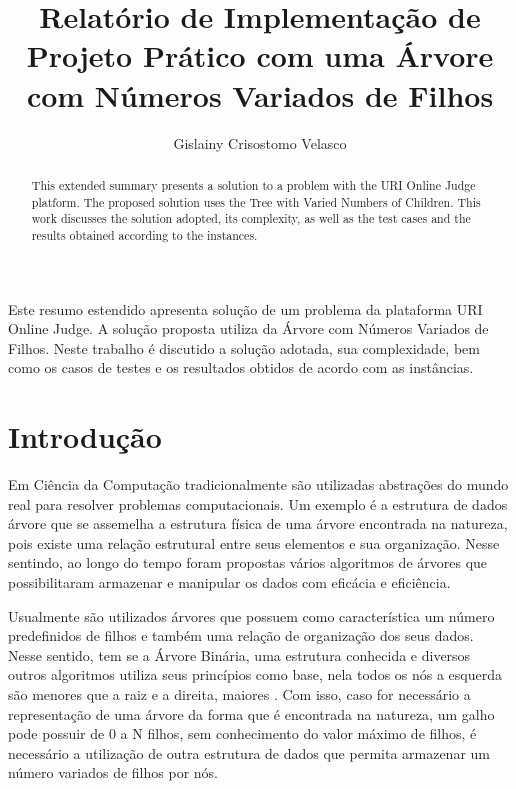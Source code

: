 \documentclass[12pt]{article}
\title{Relatório de Implementação de Projeto Prático com uma Árvore com Números Variados de Filhos}
\author{Gislainy Crisostomo Velasco}
\begin{document}
 

\maketitle

\begin{abstract}
  This extended summary presents a solution to a problem with the URI Online Judge platform. The proposed solution uses the Tree with Varied Numbers of Children. This work discusses the solution adopted, its complexity, as well as the test cases and the results obtained according to the instances.
\end{abstract}
     
\begin{resumo} 
Este resumo estendido apresenta solução de um problema da plataforma URI Online Judge. A solução proposta utiliza da Árvore com Números Variados de Filhos. Neste trabalho é discutido a solução adotada, sua complexidade, bem como os casos de testes e os resultados obtidos de acordo com as instâncias. 
\end{resumo}

\section{Introdução}

Em Ciência da Computação tradicionalmente são utilizadas abstrações do mundo real para resolver problemas computacionais. Um exemplo é a estrutura de dados árvore que se assemelha a estrutura física de uma árvore encontrada na natureza, pois existe uma relação estrutural entre seus elementos e sua organização. Nesse sentindo, ao longo do tempo foram propostas vários algoritmos de árvores que possibilitaram armazenar e manipular os dados com eficácia e eficiência. 

Usualmente são utilizados árvores que possuem como característica um número predefinidos de filhos e também uma relação de organização dos seus dados. Nesse sentido, tem se a Árvore Binária, uma estrutura conhecida e diversos outros algoritmos utiliza seus princípios como base, nela todos os nós a esquerda são menores que a raiz e a direita, maiores \cite{cormen2009introduction}. Com isso, caso for necessário a representação de uma árvore da forma que 
é encontrada na natureza, um galho pode possuir de 0 a N filhos, sem conhecimento do valor máximo de filhos, é necessário a utilização de outra estrutura de dados que permita armazenar um número variados de filhos por nós.
\end{document}
